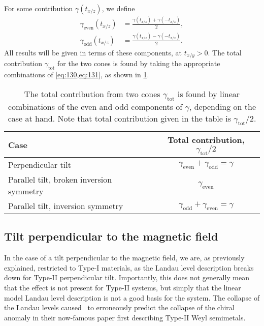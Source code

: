 For some contribution \( \gamma(t_{x /z}) \), we define
\begin{align}
  \gamma_{\text{even}}(t_{x/z}) &= \frac{\gamma(t_{x/z}) + \gamma(-t_{x/z})}{2}\label{eq:130},\\
  \gamma_{\text{odd}}(t_{x/z}) &= \frac{\gamma(t_{x/z}) - \gamma(-t_{x/z})}{2}\label{eq:131}.
\end{align}
All results will be given in terms of these components, at \( t_{x /y} > 0 \).
The total contribution \( \gamma_{\text{tot}} \) for the two cones is found by taking the appropriate combinations of \cref{eq:130,eq:131}, as shown in \cref{tab:gamma-tot}.

\begin{table}[h]
  \centering
  \caption{The total contribution from two cones \( \gamma_{\text{tot}} \) is found by linear combinations of the even and odd components of \( \gamma \), depending on the case at hand.
    Note that total contribution given in the table is \( \gamma_{\text{tot}} /2 \).%
    \label{tab:gamma-tot}}
  \begin{tabular}{l c}
    \toprule
    Case & Total contribution, \( \gamma_{\text{tot}} /2 \)\\
    \midrule
    Perpendicular tilt & \( \gamma_{\text{even}} + \gamma_{\text{odd}} = \gamma \)\\
    Parallel tilt, broken inversion symmetry & \( \gamma_{\text{even}} \)\\
    Parallel tilt, inversion symmetry &  \(  \gamma_{\text{odd}} + \gamma_{\text{even}} = \gamma \)\\\bottomrule
  \end{tabular}
\end{table}

\subsection{Tilt perpendicular to the magnetic field}
In the case of a tilt perpendicular to the magnetic field, we are, as previously explained, restricted to Type-I materials, as the Landau level description breaks down for Type-II perpendicular tilt.
Importantly, this does not generally mean that the effect is not present for Type-II systems, but simply that the linear model Landau level description is not a good basis for the system.
The collapse of the Landau levels caused~\textcite{soluyanovTypeIIWeylSemimetals2015} to erroneously predict the collapse of the chiral anomaly in their now-famous paper first describing Type-II Weyl semimetals.

